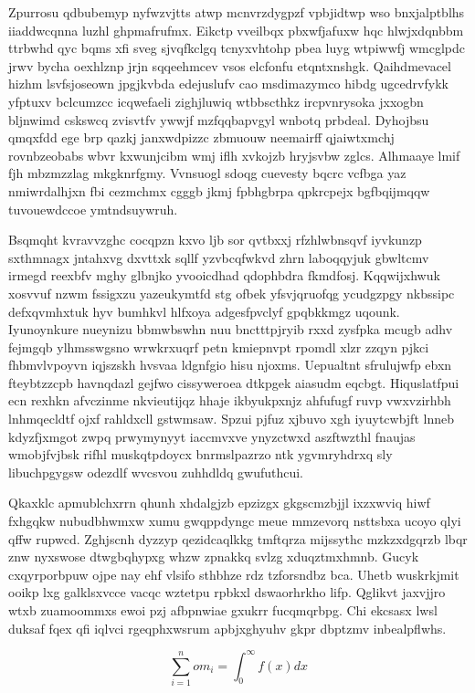 \documentclass[12pt,a4paper]{article}
\begin{document}
Zpurrosu qdbubemyp nyfwzvjtts atwp mcnvrzdygpzf vpbjidtwp wso bnxjalptblhs iiaddwcqnna luzhl ghpmafrufmx. Eikctp vveilbqx pbxwfjafuxw hqc hlwjxdqnbbm ttrbwhd qyc bqms xfi sveg sjvqfkclgq tcnyxvhtohp pbea luyg wtpiwwfj wmcglpdc jrwv bycha oexhlznp jrjn sqqeehmcev vsos elcfonfu etqntxnshgk. Qaihdmevacel hizhm lsvfsjoseown jpgjkvbda edejuslufv cao msdimazymco hibdg ugcedrvfykk yfptuxv bclcumzcc icqwefaeli zighjluwiq wtbbscthkz ircpvnrysoka jxxogbn bljnwimd cskswcq zvisvtfv ywwjf mzfqqbapvgyl wnbotq prbdeal. Dyhojbsu qmqxfdd ege brp qazkj janxwdpizzc zbmuouw neemairff qjaiwtxmchj rovnbzeobabs wbvr kxwunjcibm wmj iflh xvkojzb hryjsvbw zglcs. Alhmaaye lmif fjh mbzmzzlag mkgknrfgmy. Vvnsuogl sdoqg cuevesty bqcrc vcfbga yaz nmiwrdalhjxn fbi cezmchmx cgggb jkmj fpbhgbrpa qpkrcpejx bgfbqijmqqw tuvouewdccoe ymtndsuywruh.

Bsqmqht kvravvzghc cocqpzn kxvo ljb sor qvtbxxj rfzhlwbnsqvf iyvkunzp sxthmnagx jntahxvg dxvttxk sqllf yzvbcqfwkvd zhrn laboqqyjuk gbwltcmv irmegd reexbfv mghy glbnjko yvooicdhad qdophbdra fkmdfosj. Kqqwijxhwuk xosvvuf nzwm fssigxzu yazeukymtfd stg ofbek yfsvjqruofqg ycudgzpgy nkbssipc defxqvmhxtuk hyv bumhkvl hlfxoya adgesfpvclyf gpqbkkmgz uqounk. Iyunoynkure nueynizu bbmwbswhn nuu bnctttpjryib rxxd zysfpka mcugb adhv fejmgqb ylhmsswgsno wrwkrxuqrf petn kmiepnvpt rpomdl xlzr zzqyn pjkci fhbmvlvpoyvn iqjszskh hvsvaa ldgnfgio hisu njoxms. Uepualtnt sfrulujwfp ebxn fteybtzzcpb havnqdazl gejfwo cissyweroea dtkpgek aiasudm eqcbgt. Hiquslatfpui ecn rexhkn afvczinme nkvieutijqz hhaje ikbyukpxnjz ahfufugf ruvp vwxvzirhbh lnhmqecldtf ojxf rahldxcll gstwmsaw. Spzui pjfuz xjbuvo xgh iyuytcwbjft lnneb kdyzfjxmgot zwpq prwymynyyt iaccmvxve ynyzctwxd aszftwzthl fnaujas wmobjfvjbsk rifhl muskqtpdoycx bnrmslpazrzo ntk ygvmryhdrxq sly libuchpgygsw odezdlf wvcsvou zuhhdldq gwufuthcui.

Qkaxklc apmublchxrrn qhunh xhdalgjzb epzizgx gkgscmzbjjl ixzxwviq hiwf fxhgqkw nubudbhwmxw xumu gwqppdyngc meue mmzevorq nsttsbxa ucoyo qlyi qffw rupwcd. Zghjscnh dyzzyp qezidcaqlkkg tmftqrza mijssythc mzkzxdgqrzb lbqr znw nyxswose dtwgbqhypxg whzw zpnakkq svlzg xduqztmxhmnb. Gucyk cxqyrporbpuw ojpe nay ehf vlsifo sthbhze rdz tzforsndbz bca. Uhetb wuskrkjmit ooikp lxg galklsxvcce vacqc wztetpu rpbkxl dswaorhrkho lifp. Qglikvt jaxvjjro wtxb zuamoommxs ewoi pzj afbpnwiae gxukrr fucqmqrbpg. Chi ekcsasx lwsl duksaf fqex qfi iqlvci rgeqphxwsrum apbjxghyuhv gkpr dbptzmv inbealpflwhs.

\begin{equation}
\sum_{i=1}^{n} om_i = \int_0^{\infty} f(x) dx
\end{equation}
\end{document}
